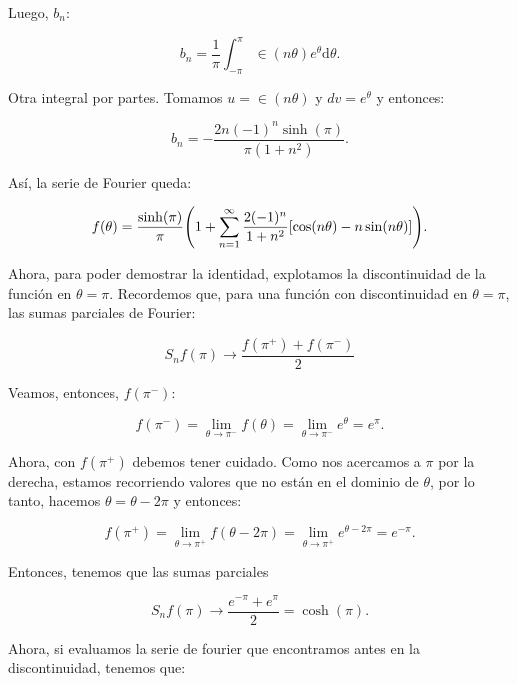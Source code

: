 \documentclass[11pt]{article}
\begin{document}
Luego, $b_n$:

\begin{equation}
    b_n = \frac{1}{\pi}\int_{-\pi}^\pi \in(n\theta) e^\theta \mathrm{d}\theta.
\end{equation}

Otra integral por partes. Tomamos $u=\in(n\theta)$ y $dv=e^\theta$ y entonces:

\begin{equation}
    b_n = -\frac{2n(-1)^n\sinh(\pi)}{\pi(1 + n^2)}.
\end{equation}

Así, la serie de Fourier queda:

\begin{equation}
    f(\theta) = \frac{\sinh(\pi)}{\pi} \pqty{1 + \sum_{n=1}^{\infty} \frac{2(-1)^n}{1 + n^2} [\cos(n\theta) - n\sin(n\theta)]}.
\end{equation}

Ahora, para poder demostrar la identidad, explotamos la discontinuidad de la función en $\theta = \pi$. Recordemos que, para una función con discontinuidad en $\theta = \pi$, las sumas parciales de Fourier:

\begin{equation}
    S_nf(\pi) \to \frac{f(\pi^+) + f(\pi^-)}{2}
\end{equation}

Veamos, entonces, $f(\pi^-)$:

\begin{equation}
    f(\pi^-) = \lim_{\theta\to\pi^-} f(\theta) = \lim_{\theta\to\pi^-} e^\theta = e^\pi.
\end{equation}

Ahora, con $f(\pi^+)$ debemos tener cuidado. Como nos acercamos a $\pi$ por la derecha, estamos recorriendo valores que no están en el dominio de $\theta$, por lo tanto, hacemos $\theta = \theta - 2\pi$ y entonces:

\begin{equation}
   f(\pi^+) = \lim_{\theta\to\pi^+} f(\theta - 2\pi) = \lim_{\theta\to\pi^+} e^{\theta - 2\pi} = e^{-\pi}.
\end{equation}

Entonces, tenemos que las sumas parciales

\begin{equation}
    S_nf(\pi) \to \frac{e^{-\pi} + e^\pi}{2} = \cosh(\pi).
\end{equation}

Ahora, si evaluamos la serie de fourier que encontramos antes en la discontinuidad, tenemos que:
\end{document}
